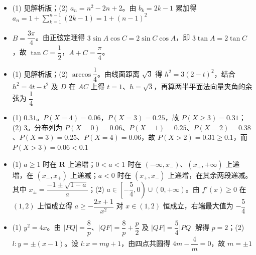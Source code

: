 \begin{itemize}[leftmargin=2.6em]
  \item[\textbf{17.}] (1) 见解析版；(2) $a_n=n^2-2n+2$。由 $b_k=2k-1$ 累加得 $a_n=1+\sum\limits_{k=1}^{n-1}(2k-1)=1+(n-1)^2$
  \item[\textbf{18.}] $B=\dfrac{3\pi}{4}$。由正弦定理得 $3\sin A\cos C=2\sin C\cos A$，即 $3\tan A=2\tan C$，故 $\tan C=\dfrac12$，$A+C=\dfrac{\pi}{4}$。
  \item[\textbf{19.}] (1) 见解析版；(2) $\arccos\dfrac14$。由线面距离 $\sqrt3$ 得 $h^2=3(2-t)^2$，结合 $h^2=4t-t^2$ 及 $D$ 在 $AC$ 上得 $t=1$、$h=\sqrt3$，再算两半平面法向量夹角的余弦为 $\dfrac14$
  \item[\textbf{20.}] (1) $0.31$。$P(X=4)=0.06$，$P(X=3)=0.25$，故 $P(X\geqslant3)=0.31$；(2) $3$。分布列为 $P(X=0)=0.06$、$P(X=1)=0.25$、$P(X=2)=0.38$、$P(X=3)=0.25$、$P(X=4)=0.06$，故 $P(X>2)=0.31\geqslant0.1$，而 $P(X>3)=0.06<0.1$
  \item[\textbf{21.}] (1) $a\geqslant1$ 时在 $\mathbf R$ 上递增；$0<a<1$ 时在 $(-\infty,x_-)$、$(x_+,+\infty)$ 上递增，在 $(x_-,x_+)$ 上递减；$a<0$ 时在 $(x_+,x_-)$ 上递增，在其余两段递减。其中 $x_\pm=\dfrac{-1\pm\sqrt{1-a}}a$；(2) $a\in\left[-\dfrac54,0\right)\cup(0,+\infty)$。由 $f'(x)\geqslant0$ 在 $(1,2)$ 上恒成立得 $a\geqslant-\dfrac{2x+1}{x^2}$ 对 $x\in(1,2)$ 恒成立，右端最大值为 $-\dfrac54$
  \item[\textbf{22.}] (1) $y^2=4x$。由 $|PQ|=\dfrac8p$、$|QF|=\dfrac8p+\dfrac p2$ 及 $|QF|=\dfrac54|PQ|$ 解得 $p=2$；(2) $l:y=\pm(x-1)$。设 $l:x=my+1$，由四点共圆得 $4m-\dfrac4m=0$，故 $m=\pm1$
\end{itemize}
